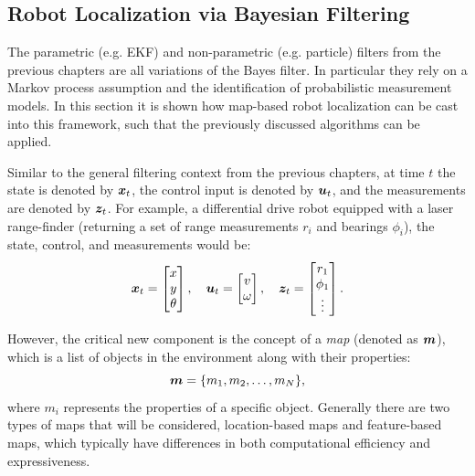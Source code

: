 \subsection{Robot Localization via Bayesian Filtering}
The parametric (e.g. EKF) and non-parametric (e.g. particle) filters from the previous chapters are all variations of the Bayes filter. In particular they rely on a Markov process assumption and the identification of probabilistic measurement models. In this section it is shown how map-based robot localization can be cast into this framework, such that the previously discussed algorithms can be applied.

Similar to the general filtering context from the previous chapters, at time $t$ the state is denoted by $\bm{x}_t$, the control input is denoted by $\bm{u}_t$, and the measurements are denoted by $\bm{z}_t$. For example, a differential drive robot equipped with a laser range-finder (returning a set of range measurements $r_i$ and bearings $\phi_i$), the state, control, and measurements would be:
\begin{equation}
\bm{x}_{t} = \begin{bmatrix} x \\ y \\ \theta
\end{bmatrix}, \quad
\bm{u}_{t} = \begin{bmatrix} v \\ \omega 
\end{bmatrix}, \quad
\bm{z}_{t} =  \begin{bmatrix} r_1 \\ \phi_1 \\  \vdots
\end{bmatrix}.
\end{equation}

However, the critical new component is the concept of a \textit{map} (denoted as $\bm{m}$), which is a list of objects in the environment along with their properties:
\begin{equation}
\bm{m} = \{ m_1 , m_2 , \ldots , m_N \},
\end{equation}
where $m_i$ represents the properties of a specific object. Generally there are two types of maps that will be considered, location-based maps and feature-based maps, which typically have differences in both computational efficiency and expressiveness.

